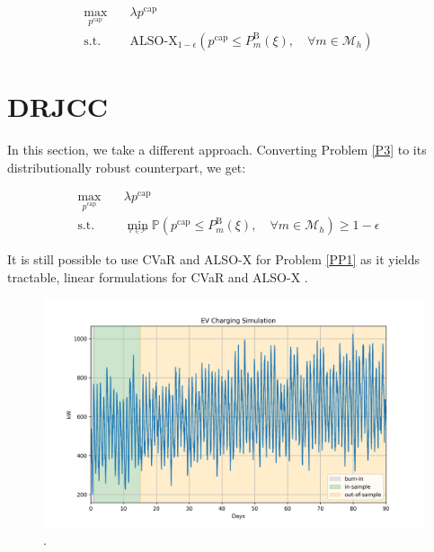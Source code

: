 \documentclass{report}
\begin{document}
\begin{align}\label{P5}
    \max_{p^{\text{cap}}} \quad & \lambda p^{\text{cap}}                                                                                                       \\
    \text{s.t.} \quad           & \text{ALSO-X}_{1-\epsilon} \left( p^{\text{cap}} \leq P_{m}^{\text{B}}(\xi), \quad \forall{m} \in \mathcal{M}_{h}  \right) &
\end{align}

\section*{DRJCC}

In this section, we take a different approach. Converting Problem \ref{P3} to its distributionally robust counterpart, we get:

\begin{align}\label{PP1}
    \max_{p^{\text{cap}}} \quad & \lambda p^{\text{cap}}                                                                                                                                               \\
    \text{s.t.} \quad           & \min_{_{\mathbb{P} \in \mathcal{P}}}  \mathbb{P} \left( p^{\text{cap}} \leq P_{m}^{\text{B}}(\xi), \quad \forall{m} \in \mathcal{M}_{h}  \right) \geq 1 - \epsilon &
\end{align}

It is still possible to use CVaR and ALSO-X for Problem \ref{PP1} as it yields tractable, linear formulations \cite{ordoudis2021energy} for CVaR and ALSO-X \cite{jiang2023also}.

\begin{figure}[t]
    \centering
    \includegraphics[width=0.99\columnwidth]{figures/drjcc_raw.png}
    \caption{.}
\end{figure}
\end{document}
